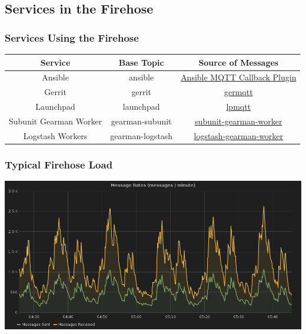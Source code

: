 \documentclass[aspectratio=169,11pt,hyperref={colorlinks=true}]{beamer}
\begin{document}
\subsection{Services in the Firehose}
\begin{frame}
    \frametitle{Services Using the Firehose}
    \begin{center}
        \begin{tabular}{ccc}
            \hline
            \textbf{Service} & \textbf{Base Topic} & \textbf{Source of Messages}\\
            \hline
            Ansible & ansible & \href{http://git.openstack.org/cgit/openstack-infra/system-config/tree/modules/openstack_project/files/puppetmaster/mqtt.py}{Ansible MQTT Callback Plugin} \\
            Gerrit & gerrit & \href{http://git.openstack.org/cgit/openstack-infra/germqtt/}{germqtt} \\
            Launchpad & launchpad & \href{http://git.openstack.org/cgit/openstack-infra/lpmqtt/}{lpmqtt} \\
            Subunit Gearman Worker & gearman-subunit & \href{http://git.openstack.org/cgit/openstack-infra/puppet-subunit2sql/tree/files/subunit-gearman-worker.py}{subunit-gearman-worker} \\
            Logstash Workers & gearman-logstash & \href{http://git.openstack.org/cgit/openstack-infra/puppet-log_processor/tree/files/log-gearman-worker.py}{logstash-gearman-worker} \\
        \end{tabular}
    \end{center}
\end{frame}

\begin{frame}
    \frametitle{Typical Firehose Load}
    \centering
    \includegraphics[width=.9\textwidth]{typical_message_rates.png}
\end{frame}
\end{document}
